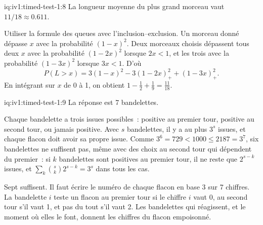 \enlargethispage{-4\baselineskip}%
\begin{solution}{iq:iv1:timed-test-1:8}
La longueur moyenne du plus grand morceau vaut $11/18 \approx 0.611$.

Utiliser la formule des queues avec l'inclusion--exclusion. Un morceau donné dépasse $x$ avec la probabilité $(1 - x)^2$. Deux morceaux choisis dépassent tous deux $x$ avec la probabilité $(1 - 2x)^2$ lorsque $2x < 1$, et les trois avec la probabilité $(1 - 3x)^2$ lorsque $3x < 1$. D'où
\[
P(L > x) = 3(1 - x)^2 - 3(1 - 2x)_+^2 + (1 - 3x)_+^2 .
\]
En intégrant sur $x$ de 0 à 1, on obtient $1 - \tfrac12 + \tfrac19 = \tfrac{11}{18}$.

\end{solution}

\begin{solution}{iq:iv1:timed-test-1:9}
La réponse est 7 bandelettes.

Chaque bandelette a trois issues possibles~: positive au premier tour, positive au second tour, ou jamais positive. Avec $s$ bandelettes, il y a au plus $3^s$ issues, et chaque flacon doit avoir sa propre issue. Comme $3^6 = 729 < 1000 \le 2187 = 3^7$, six bandelettes ne suffisent pas, même avec des choix au second tour qui dépendent du premier~: si $k$ bandelettes sont positives au premier tour, il ne reste que $2^{s-k}$ issues, et $\sum_k \binom{s}{k}2^{s-k} = 3^s$ dans tous les cas.

Sept suffisent. Il faut écrire le numéro de chaque flacon en base 3 sur 7 chiffres. La bandelette $i$ teste un flacon au premier tour si le chiffre $i$ vaut 0, au second tour s'il vaut 1, et pas du tout s'il vaut 2. Les bandelettes qui réagissent, et le moment où elles le font, donnent les chiffres du flacon empoisonné.

\end{solution}

